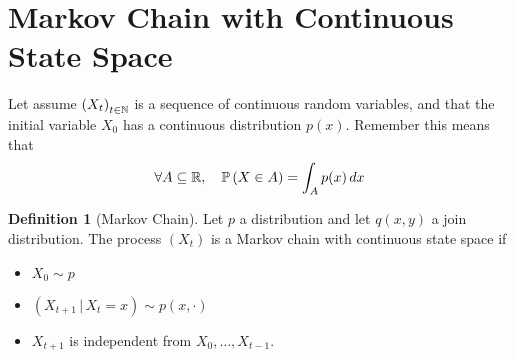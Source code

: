 \documentclass{report}
\theoremstyle{definition}
\newtheorem{defn}{Definition}
\begin{document}
\section{Markov Chain with Continuous State Space}
Let assume $\left(X_t \right)_{t\in\mathbb{N}}$ is a sequence of continuous random
variables, and that the initial variable $X_0$ has a continuous
distribution $p(x)$. Remember this means that
\begin{equation}
  \forall A\subseteq \mathbb{R},\quad \mathbb{P}\left( X\in A \right)=\int_A p(x)\,dx
  \label{eq:distribution}
\end{equation}
\begin{defn}[Markov Chain]
  Let $p$ a distribution and let $q(x,y)$ a join distribution. The process
$\left( X_t \right)$ is a Markov chain with continuous state space if
\begin{itemize}
  \item $X_0\sim p$
  \item $\left(X_{t+1}\,\vert\, X_t=x \right) \sim p(x,\cdot)$
  \item $X_{t+1}$ is independent from $X_0,\dots,X_{t-1}$.
\end{itemize}
\end{defn}
\end{document}
